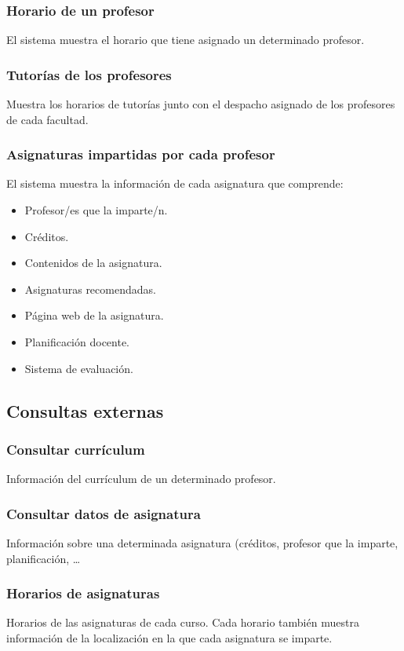 \documentclass[11pt,a4paper,spanish,twoside]{book}
\begin{document}
\subsubsection{Horario de un profesor}
El sistema muestra el horario que tiene asignado un determinado profesor.

\subsubsection{Tutorías de los profesores} 
Muestra los horarios de tutorías junto con el despacho asignado de los
profesores de cada facultad.
 
\subsubsection{Asignaturas impartidas por cada profesor}
El sistema muestra la información de cada asignatura que comprende:
\begin{itemize}
\item Profesor/es que la imparte/n.
\item Créditos.
\item Contenidos de la asignatura.
\item Asignaturas recomendadas.
\item Página web de la asignatura.
\item Planificación docente.
\item Sistema de evaluación.
\end{itemize}

\subsection{Consultas externas}
\subsubsection{Consultar currículum}

Información del currículum de un determinado profesor.

\subsubsection{Consultar datos de asignatura} 
Información sobre una determinada asignatura (créditos, profesor que la
imparte, planificación, \dots
\subsubsection{Horarios de asignaturas}
Horarios de las asignaturas de cada curso. Cada horario
también muestra información de la localización en la que cada asignatura se
imparte. 
\end{document}
